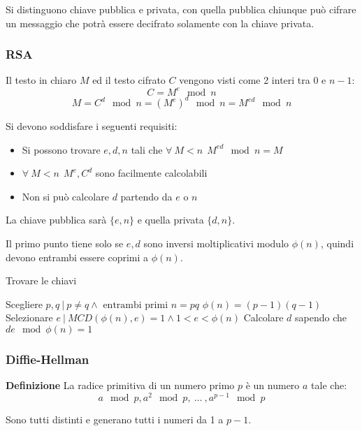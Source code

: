 \documentclass{article}
\begin{document}
Si distinguono chiave pubblica e privata, con quella pubblica chiunque può cifrare un messaggio che potrà essere decifrato solamente con la chiave privata.

\subsubsection{RSA}

Il testo in chiaro $M$ ed il testo cifrato $C$ vengono visti come 2 interi tra 0 e $n-1$:
$$C=M^e\mod n$$
$$M=C^d\mod n=(M^e)^d\mod n=M^{ed}\mod n$$

\noindent Si devono soddisfare i seguenti requisiti:
\begin{itemize}
    \item Si possono trovare $e,d,n$ tali che $\forall\ M<n\ \ M^{ed}\mod n=M$
    \item $\forall\ M<n\ \ M^e,C^d$ sono facilmente calcolabili
    \item Non si può calcolare $d$ partendo da $e$ o $n$
\end{itemize}

\noindent La chiave pubblica sarà $\{e,n\}$ e quella privata $\{d,n\}$.\newline

\noindent Il primo punto tiene solo se $e,d$ sono inversi moltiplicativi modulo $\phi(n)$, quindi devono entrambi essere coprimi a $\phi(n)$.

\begin{algorithm}[ht]
\caption{Trovare le chiavi}
\begin{algorithmic}

\State Scegliere $p,q\ |\ p\neq q\wedge\text{ entrambi primi}$
\State $n=pq$
\State $\phi(n)=(p-1)(q-1)$
\State Selezionare $e\ |\ MCD(\phi(n),e)=1\wedge1<e<\phi(n)$
\State Calcolare $d$ sapendo che $de\mod\phi(n)=1$

\end{algorithmic}
\end{algorithm}

\subsubsection{Diffie-Hellman}

\noindent\textbf{Definizione} La radice primitiva di un numero primo $p$ è un numero $a$ tale che:
$$a\mod p,a^2\mod p,\ \ldots\ ,a^{p-1}\mod p $$

\noindent Sono tutti distinti e generano tutti i numeri da 1 a $p-1$.\newline
\end{document}
